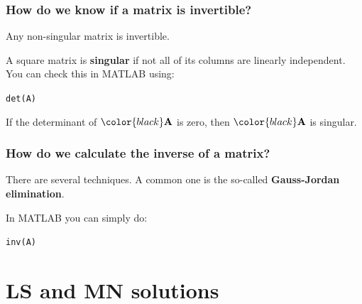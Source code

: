 \documentclass[compress]{beamer}
\newcommand{\black}[1]{{\color{black}#1}}
\renewcommand{\emph}[1]{\textbf{\black{#1}}}
\begin{document}

\begin{frame}[fragile]
\frametitle{How do we know if a matrix is invertible?}

Any non-singular matrix is invertible. 

\vspace{.5cm}
A square matrix is \emph{singular} if not all of its columns are linearly independent. You can check this in MATLAB using:

\vspace{.5cm}
\color{black}\verb|det(A)|\color{gray}

\vspace{.5cm}
If the determinant of $\black{\A}$ is zero, then $\black{\A}$ is singular.


\end{frame}



\begin{frame}[fragile]
\frametitle{How do we calculate the inverse of a matrix?}

There are several techniques. A common one is the so-called \emph{Gauss-Jordan elimination}.

\vspace{.5cm}

In MATLAB you can simply do:

\vspace{.5cm}

\color{black}
\verb|inv(A)|
\color{gray}

\end{frame}


\section{LS and MN solutions}
\subsection*{}
\end{document}
